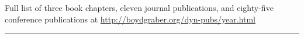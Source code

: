 \documentclass[11pt]{amsart}
\begin{document}
\clearpage




\begin{center}
Full list of  three book chapters, eleven journal publications, and eighty-five conference
publications at \url{http://boydgraber.org/dyn-pubs/year.html}
\end{center}

%

\noindent\rule{4cm}{0.4pt}
\end{document}
